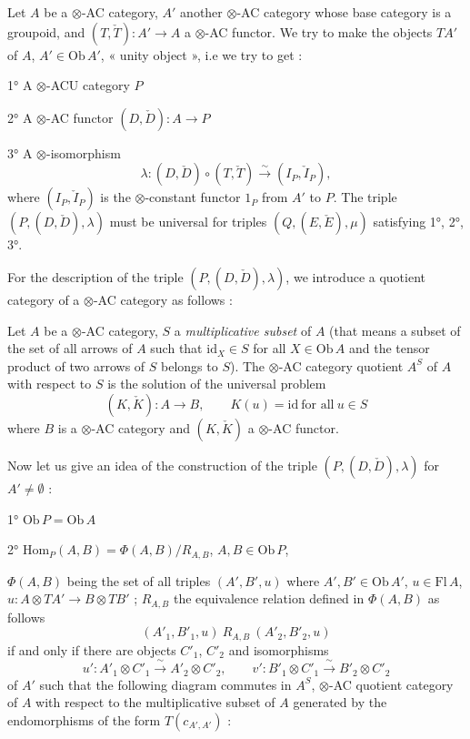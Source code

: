 \documentclass[11pt,a4paper]{article}
\begin{document}
Let $A$ be a $\otimes$-AC category, $A'$ another $\otimes$-AC category
whose base category is a groupoid, and $(T, \check{T}) : A' \to A$ a
$\otimes$-AC functor. We try to make the objects $TA'$ of $A$, $A' \in
\mathrm{Ob}\,A'$, « unity object », i.e we try to get :

1° A $\otimes$-ACU category $P$

2° A $\otimes$-AC functor $(D, \check{D}) : A \to P$

3° A $\otimes$-isomorphism
\[
\lambda : (D, \check{D}) \circ (T, \check{T}) \xrightarrow{\ \sim\ }
(I_{P}, \check{I}_{P}),
\]
where $(I_{P}, \check{I}_{P})$ is the $\otimes$-constant functor $1_{P}$
from $A'$ to $P$. The triple $(P, (D, \check{D}), \lambda)$ must be
universal for triples $(Q, (E, \check{E}), \mu)$ satisfying 1°, 2°, 3°.

For the description of the triple $(P, (D, \check{D}), \lambda)$, we
introduce a quotient category of a $\otimes$-AC category as follows :

Let $A$ be a $\otimes$-AC category, $S$ a \emph{multiplicative subset} of
$A$ (that means a subset of the set of all  arrows
of $A$ such that $\mathrm{id}_{X} \in S$ for all $X \in \mathrm{Ob}\,A$
and the tensor product of two arrows of $S$ belongs to $S$).  The $\otimes$-AC category quotient $A^{S}$ of $A$
with respect to $S$ is the solution of the universal problem
\[
(K, \check{K}) : A \longrightarrow B, \qquad
K(u) = \mathrm{id} \ \text{for all} \ u \in S
\]
where $B$ is a $\otimes$-AC category and $(K, \check{K})$ a $\otimes$-AC
functor.

Now let us give an idea of the construction of the triple $(P, (D,
\check{D}), \lambda)$ for $A' \neq \emptyset$ :

1° $\mathrm{Ob}\,P = \mathrm{Ob}\,A$

2° $\mathrm{Hom}_{P}(A,B) = \Phi(A,B)/R_{A,B}$, \quad $A, B \in
\mathrm{Ob}\,P$,

$\Phi(A,B)$ being the set of all triples $(A', B', u)$ where $A', B' \in
\mathrm{Ob}\,A'$, $u \in \mathrm{Fl}\,A$, $u : A \otimes TA' \to B \otimes
TB'$ ; $R_{A,B}$ the equivalence relation defined in $\Phi(A,B)$ as
follows
\[
(A'_{1}, B'_{1}, u) \ R_{A,B} \ (A'_{2}, B'_{2}, u)
\]
if and only if there are objects $C'_{1}$, $C'_{2}$ and isomorphisms
\[
u' : A'_{1} \otimes C'_{1} \xrightarrow{\ \sim\ } A'_{2} \otimes C'_{2},
\qquad
v' : B'_{1} \otimes C'_{1} \xrightarrow{\ \sim\ } B'_{2} \otimes C'_{2}
\]
of $A'$ such that the following diagram commutes in $A^{S}$, $\otimes$-AC
quotient category of $A$ with respect to the multiplicative subset of $A$
generated by the endomorphisms of the form $T(c_{A',A'})$ :
\end{document}
